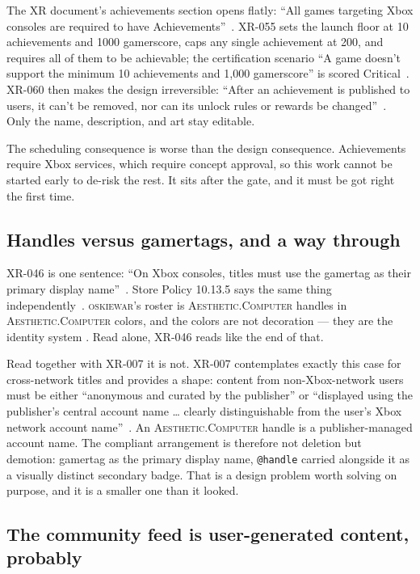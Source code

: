 \documentclass[10pt,letterpaper,twocolumn]{article}
\newcommand{\ac}{\textsc{Aesthetic.Computer}}
\newcommand{\game}{\textsc{oskiewar}}
\newcommand{\code}[1]{\texttt{#1}}
\begin{document}
The XR document's achievements section opens flatly: ``All games targeting Xbox consoles are required to have Achievements''~\cite{msXR}. XR-055 sets the launch floor at 10 achievements and 1000 gamerscore, caps any single achievement at 200, and requires all of them to be achievable; the certification scenario ``A game doesn't support the minimum 10 achievements and 1,000 gamerscore'' is scored Critical~\cite{msXR055}. XR-060 then makes the design irreversible: ``After an achievement is published to users, it can't be removed, nor can its unlock rules or rewards be changed''~\cite{msXR}. Only the name, description, and art stay editable.

The scheduling consequence is worse than the design consequence. Achievements require Xbox services, which require concept approval, so this work cannot be started early to de-risk the rest. It sits after the gate, and it must be got right the first time.

\subsection{Handles versus gamertags, and a way through}

XR-046 is one sentence: ``On Xbox consoles, titles must use the gamertag as their primary display name''~\cite{msXR}. Store Policy 10.13.5 says the same thing independently~\cite{msStorePolicies}. \game{}'s roster is \ac{} handles in \ac{} colors, and the colors are not decoration --- they are the identity system \cite{scudder2026url}. Read alone, XR-046 reads like the end of that.

Read together with XR-007 it is not. XR-007 contemplates exactly this case for cross-network titles and provides a shape: content from non-Xbox-network users must be either ``anonymous and curated by the publisher'' or ``displayed using the publisher's central account name \dots{} clearly distinguishable from the user's Xbox network account name''~\cite{msXR}. An \ac{} handle is a publisher-managed account name. The compliant arrangement is therefore not deletion but demotion: gamertag as the primary display name, \code{@handle} carried alongside it as a visually distinct secondary badge. That is a design problem worth solving on purpose, and it is a smaller one than it looked.

\subsection{The community feed is user-generated content, probably}
\end{document}
